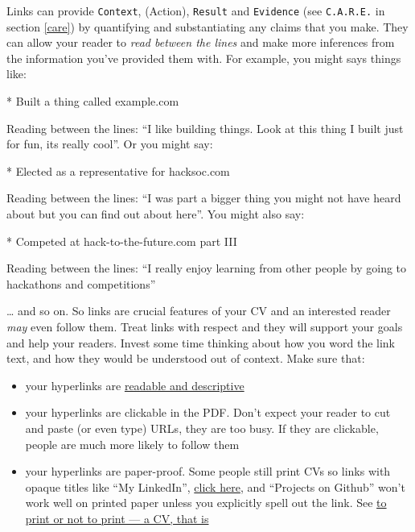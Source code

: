 \documentclass[
]{book}
\newenvironment{Shaded}{\begin{snugshade}}{\end{snugshade}}
\newcommand{\NormalTok}[1]{#1}
\newcommand{\SpecialStringTok}[1]{\textcolor[rgb]{0.31,0.60,0.02}{#1}}
\providecommand{\tightlist}{%
  \setlength{\itemsep}{0pt}\setlength{\parskip}{0pt}}
\begin{document}
Links can provide \texttt{Context}, (Action), \texttt{Result} and \texttt{Evidence} (see \texttt{C.A.R.E.} in section \ref{care}) by quantifying and substantiating any claims that you make. They can allow your reader to \emph{read between the lines} and make more inferences from the information you've provided them with. For example, you might says things like:

\begin{Shaded}
\begin{Highlighting}[]
\SpecialStringTok{* }\NormalTok{Built a thing called example.com}
\end{Highlighting}
\end{Shaded}

Reading between the lines: ``I like building things. Look at this thing I built just for fun, its really cool''. Or you might say:

\begin{Shaded}
\begin{Highlighting}[]
\SpecialStringTok{* }\NormalTok{Elected as a representative for hacksoc.com}
\end{Highlighting}
\end{Shaded}

Reading between the lines: ``I was part a bigger thing you might not have heard about but you can find out about here''. You might also say:

\begin{Shaded}
\begin{Highlighting}[]
\SpecialStringTok{* }\NormalTok{Competed at hack{-}to{-}the{-}future.com part III}
\end{Highlighting}
\end{Shaded}

Reading between the lines: ``I really enjoy learning from other people by going to hackathons and competitions''

\ldots{} and so on. So links are crucial features of your CV and an interested reader \emph{may} even follow them. Treat links with respect and they will support your goals and help your readers. Invest some time thinking about how you word the link text, and how they would be understood out of context. Make sure that:

\begin{itemize}
\tightlist
\item
  your hyperlinks are \href{https://readabilityguidelines.co.uk/content-design/links/}{readable and descriptive} \citep{readable}\\
\item
  your hyperlinks are clickable in the PDF. Don't expect your reader to cut and paste (or even type) URLs, they are too busy. If they are clickable, people are much more likely to follow them
\item
  your hyperlinks are paper-proof. Some people still print CVs so links with opaque titles like ``My LinkedIn'', \href{https://www.w3.org/QA/Tips/noClickHere.html}{click here}, and ``Projects on Github'' won't work well on printed paper unless you explicitly spell out the link. See \href{https://bbc.in/3zXv6zr}{to print or not to print --- a CV, that is} \citep{printcv}
\end{itemize}
\end{document}

